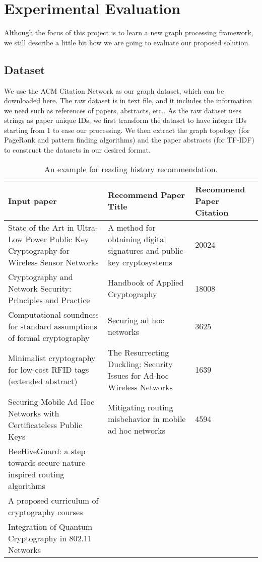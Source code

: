 \section{Experimental Evaluation}
%
Although the focus of this project is to learn a new graph processing framework, we still describe a little bit how we are going to evaluate our proposed solution.
%
\subsection{Dataset} \label{dataset}
%
We use the ACM Citation Network as our graph dataset, which can be downloaded \href{https://aminer.org/citation}{\underline{here}}.
%
The raw dataset is in text file, and it includes the information we need such as references of papers, abstracts, etc..
%
As the raw dataset uses strings as paper unique IDs, we first transform the dataset to have integer IDs starting from 1 to ease our processing.
%
We then extract the graph topology (for PageRank and pattern finding algorithms) and the paper abstracts (for TF-IDF) to construct the datasets in our desired format.
%
\begin{table*}[ht]
	\centering
	\begin{tabular}{p{7cm}p{7cm}p{3cm}}
		\toprule
		\textbf{Input paper}		& \textbf{Recommend Paper Title} 		& \textbf{Recommend Paper Citation} 	\\ \midrule
		State of the Art in Ultra-Low Power Public Key Cryptography for Wireless Sensor Networks &A method for obtaining digital signatures and public-key cryptosystems	&20024\\
		Cryptography and Network Security: Principles and Practice				&Handbook of Applied Cryptography &18008\\
		Computational soundness for standard assumptions of formal cryptography				&Securing ad hoc networks &3625\\
		Minimalist cryptography for low-cost RFID tags (extended abstract)				&The Resurrecting Duckling: Security Issues for Ad-hoc Wireless Networks &1639\\
		Securing Mobile Ad Hoc Networks with Certificateless Public Keys				&Mitigating routing misbehavior in mobile ad hoc networks&4594\\
		BeeHiveGuard: a step towards secure nature inspired routing algorithms\\
		A proposed curriculum of cryptography courses\\
		Integration of Quantum Cryptography in 802.11 Networks\\
		\bottomrule
	\end{tabular}
	\vspace{3mm}
	\caption{An example for reading history recommendation. }
	\label{res:patternexp}
\end{table*}
%
